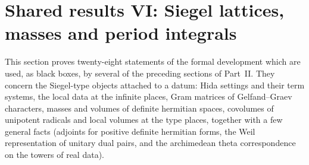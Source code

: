 \section{Shared results VI: Siegel lattices, masses and period integrals}\label{sec:pf:sh-siegel}

\providecommand{\shsiegelGap}{\mathrm{Gap}}
\providecommand{\shsiegelGG}{\gamma}
\providecommand{\shsiegelGam}{\Gamma}
\providecommand{\shsiegelHS}[1]{\lVert #1\rVert_{\mathrm{HS}}}
\providecommand{\shsiegelO}{\mathcal O}
\providecommand{\shsiegelsd}{\mu^{\mathrm{sd}}}

This section proves twenty-eight statements of the formal development \cite{LeanSource2026} which are used, as
black boxes, by several of the preceding sections of Part~II. They concern the Siegel-type objects attached to a
datum: Hida settings and their term systems, the local data at the infinite places, Gram matrices of
Gelfand--Graev characters, masses and volumes of definite hermitian spaces, covolumes of unipotent radicals and local
volumes at the type places, together with a few general facts (adjoints for positive definite hermitian forms, the
Weil representation of unitary dual pairs, and the archimedean theta correspondence on the towers of real data).

